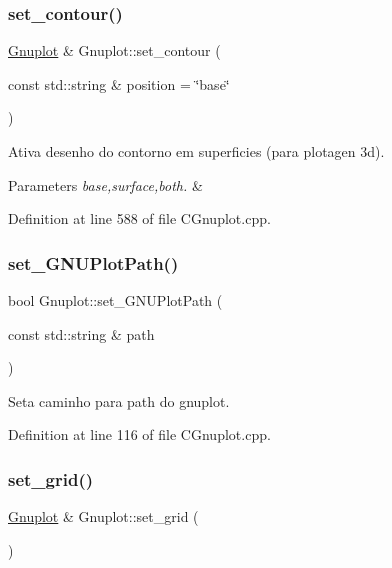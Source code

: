 \subsubsection{\texorpdfstring{set\+\_\+contour()}{set\_contour()}}
{\footnotesize\ttfamily \hyperlink{class_gnuplot}{Gnuplot} \& Gnuplot\+::set\+\_\+contour (\begin{DoxyParamCaption}\item[{const std\+::string \&}]{position = {\ttfamily \char`\"{}base\char`\"{}} }\end{DoxyParamCaption})}



Ativa desenho do contorno em superficies (para plotagen 3d). 


\begin{DoxyParams}{Parameters}
{\em base,surface,both.} & \\
\hline
\end{DoxyParams}


Definition at line 588 of file C\+Gnuplot.\+cpp.

\mbox{\label{class_gnuplot_a67cae885c26ced821e335d98986f1967}} 
\subsubsection{\texorpdfstring{set\+\_\+\+G\+N\+U\+Plot\+Path()}{set\_GNUPlotPath()}}
{\footnotesize\ttfamily bool Gnuplot\+::set\+\_\+\+G\+N\+U\+Plot\+Path (\begin{DoxyParamCaption}\item[{const std\+::string \&}]{path }\end{DoxyParamCaption})\hspace{0.3cm}{\ttfamily [static]}}



Seta caminho para path do gnuplot. 



Definition at line 116 of file C\+Gnuplot.\+cpp.

\mbox{\label{class_gnuplot_a4b7245b12dad1c0ef326e5f59eb83001}} 
\subsubsection{\texorpdfstring{set\+\_\+grid()}{set\_grid()}}
{\footnotesize\ttfamily \hyperlink{class_gnuplot}{Gnuplot} \& Gnuplot\+::set\+\_\+grid (\begin{DoxyParamCaption}{ }\end{DoxyParamCaption})}



